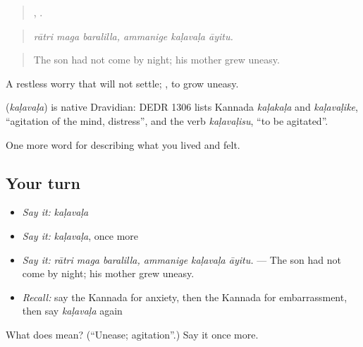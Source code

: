 \begin{quote}
  ,   .
\end{quote}

\begin{quote}
\emph{rātri maga baralilla, ammanige kaḷavaḷa āyitu.}
\end{quote}

\begin{quote}
The son had not come by night; his mother grew uneasy.
\end{quote}

A restless worry that will not settle; , to grow uneasy.

\begin{cousinweb}
\textbf{} (\emph{kaḷavaḷa}) is native Dravidian: DEDR 1306 lists Kannada \emph{kaḷakaḷa} and \emph{kaḷavaḷike}, \textquotedblleft{}agitation of the mind, distress\textquotedblright{}, and the verb \emph{kaḷavaḷisu}, \textquotedblleft{}to be agitated\textquotedblright{}.
\end{cousinweb}

\begin{grammarlens}[title={What you've built}]
One more word for describing what you lived and felt.
\end{grammarlens}

\subsection*{Your turn}
\begin{itemize}
\raggedright
  \item \emph{Say it:} \emph{kaḷavaḷa}
  \item \emph{Say it:} \emph{kaḷavaḷa}, once more
  \item \emph{Say it:} \emph{rātri maga baralilla, ammanige kaḷavaḷa āyitu.} — The son had not come by night; his mother grew uneasy.
  \item \emph{Recall:} say the Kannada for anxiety, then the Kannada for embarrassment, then say \emph{kaḷavaḷa} again
\end{itemize}

\begin{tcolorbox}[breakable,colback=teal!4,colframe=teal!35!black,title={Before you move on}]
What does  mean? (\textquotedblleft{}Unease; agitation\textquotedblright{}.) Say it once more.
\end{tcolorbox}
